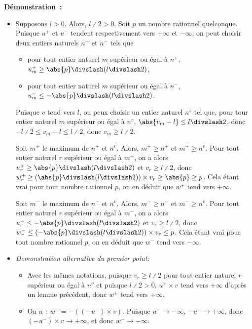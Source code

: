 \noindent\textbf{Démonstration :} 
\begin{itemize}[nosep]
    \item Supposons $l > 0$.
        Alors, $l \divslash 2 > 0$.
        Soit $p$ un nombre rationnel quelconque. 
        Puisque $u^+$ et $u^-$ tendent respectivement vers $+\infty$ et $-\infty$, on peut choisir deux entiers naturels $n^+$ et $n^-$ tels que
        \begin{itemize}[nosep]
            \item pour tout entier naturel $m$ supérieur ou égal à $n^+$, $u^+_m \geq \abs{p} \divslash (l \divslash 2)$,
            \item pour tout entier naturel $m$ supérieur ou égal à $n^-$, $u^-_m \leq -\abs{p} \divslash (l \divslash 2)$.
        \end{itemize}
        Puisque $v$ tend vers $l$, on peux choisir un entier naturel $n^v$ tel que, pour tour entier naturel $m$ supérieur ou égal à $n^v$, $\abs{v_m - l} \leq l \divslash 2$, donc $-l \divslash 2 \leq v_m - l \leq l \divslash 2$, donc $v_m \geq l \divslash 2$.
        
        Soit $m^+$ le maximum de $n^+$ et $n^v$. 
        Alors, $m^+ \geq n^+$ et $m^+ \geq n^v$.
        Pour tout entier naturel $r$ supérieur ou égal à $m^+$, on a alors $u^+_r \geq \abs{p} \divslash (l \divslash 2)$ et $v_r \geq l \divslash 2$, donc $w^+_r \geq \left( \abs{p} \divslash (l \divslash 2)\right) \times v_r \geq \abs{p} \geq p$. 
        Cela étant vrai pour tout nombre rationnel $p$, on en déduit que $w^+$ tend vers $+\infty$.

        Soit $m^-$ le maximum de $n^-$ et $n^v$. 
        Alors, $m^- \geq n^-$ et $m^- \geq n^v$.
        Pour tout entier naturel $r$ supérieur ou égal à $m^-$, on a alors $u^-_r \leq -\abs{p} \divslash (l \divslash 2)$ et $v_r \geq l \divslash 2$, donc $w^-_r \leq \left( - \abs{p} \divslash (l \divslash 2)\right) \times v_r \leq p$. 
        Cela étant vrai pour tout nombre rationnel $p$, on en déduit que $w^-$ tend vers $-\infty$.

    \item \emph{Demonstration alternative du premier point:} 
    \begin{itemize}[nosep]
        \item Avec les mêmes notations, puisque $v_r \geq l \divslash 2$ pour tout entier naturel $r$ supérieur ou égal à $n^v$ et puisque $l \divslash 2 > 0$, $u^+ \times v$ tend vers $+\infty$ d'après un lemme précédent, donc $w^+$ tend vers $+\infty$.
        \item On a : $w^- = - ((-u^-) \times v)$.
            Puisque $u^- \to -\infty$, $-u^- \to +\infty$, donc $(-u^-) \times v \to +\infty$, et donc $w^- \to -\infty$.
    \end{itemize}


\end{itemize}
